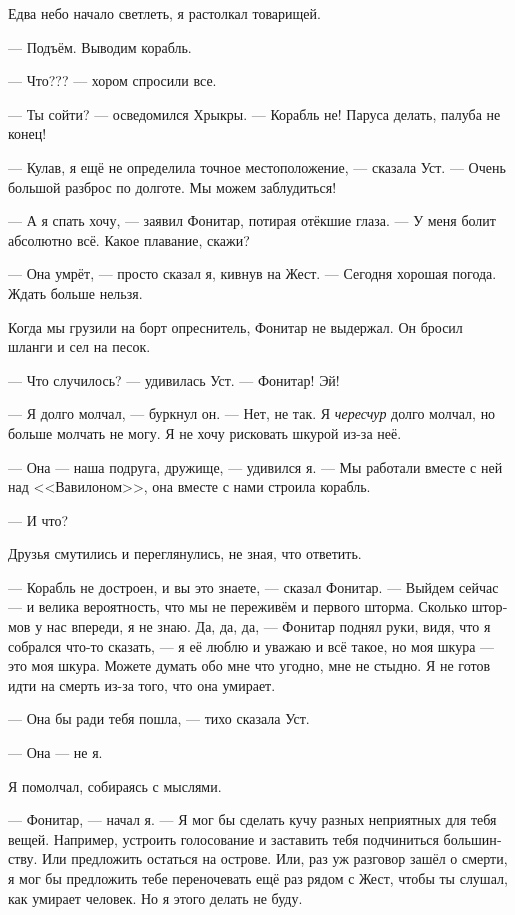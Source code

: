 \documentclass[a4paper,10pt,fleqn]{book}\usepackage{polyglossia}\setdefaultlanguage[babelshorthands=true]{russian}\setotherlanguage{english}\defaultfontfeatures{Ligatures=TeX,Mapping=tex-text}
\newcommand{\asterism}{\vspace{1em}{\centering\Large\bfseries$\ast~\ast~\ast$\par}\vspace{1em}}
\begin{document}
Едва небо начало светлеть, я растолкал товарищей.

--- Подъём.
Выводим корабль.

--- Что??? --- хором спросили все.

--- Ты сойти? --- осведомился Хрыкры.
--- Корабль не!
Паруса делать, палуба не конец!

--- Кулав, я ещё не определила точное местоположение, --- сказала Уст.
--- Очень большой разброс по долготе.
Мы можем заблудиться!

--- А я спать хочу, --- заявил Фонитар, потирая отёкшие глаза.
--- У меня болит абсолютно всё.
Какое плавание, скажи?

--- Она умрёт, --- просто сказал я, кивнув на Жест.
--- Сегодня хорошая погода.
Ждать больше нельзя.

\asterism

Когда мы грузили на борт опреснитель, Фонитар не выдержал.
Он бросил шланги и сел на песок.

--- Что случилось? --- удивилась Уст.
--- Фонитар!
Эй!

--- Я долго молчал, --- буркнул он.
--- Нет, не так.
Я \emph{чересчур} долго молчал, но больше молчать не могу.
Я не хочу рисковать шкурой из-за неё.

--- Она --- наша подруга, дружище, --- удивился я.
--- Мы работали вместе с ней над <<Вавилоном>>, она вместе с нами строила корабль.

--- И что?

Друзья смутились и переглянулись, не зная, что ответить.

--- Корабль не достроен, и вы это знаете, --- сказал Фонитар.
--- Выйдем сейчас --- и велика вероятность, что мы не переживём и первого шторма.
Сколько штормов у нас впереди, я не знаю.
Да, да, да, --- Фонитар поднял руки, видя, что я собрался что-то сказать, --- я её люблю и уважаю и всё такое, но моя шкура --- это моя шкура.
Можете думать обо мне что угодно, мне не стыдно.
Я не готов идти на смерть из-за того, что она умирает.

--- Она бы ради тебя пошла, --- тихо сказала Уст.

--- Она --- не я.

Я помолчал, собираясь с мыслями.

--- Фонитар, --- начал я.
--- Я мог бы сделать кучу разных неприятных для тебя вещей.
Например, устроить голосование и заставить тебя подчиниться большинству.
Или предложить остаться на острове.
Или, раз уж разговор зашёл о смерти, я мог бы предложить тебе переночевать ещё раз рядом с Жест, чтобы ты слушал, как умирает человек.
Но я этого делать не буду.
\end{document}
